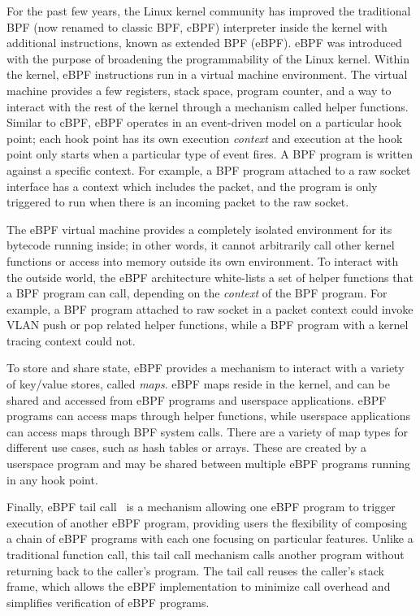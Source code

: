 \documentclass[10pt]{sigplanconf}
\begin{document}
For the past few years, the Linux kernel community has improved the traditional
BPF (now renamed to classic BPF, cBPF) interpreter inside the kernel with
additional instructions, known as extended BPF (eBPF). eBPF was introduced with
the purpose of broadening the programmability of the Linux kernel. Within the
kernel, eBPF instructions run in a virtual machine environment. The virtual
machine provides a few registers, stack space, program counter, and a way to
interact with the rest of the kernel through a mechanism called helper
functions.  Similar to cBPF, eBPF operates in an event-driven model on a
particular hook point; each hook point has its own execution {\em context} and
execution at the hook point only starts when a particular type of event fires.
A BPF program is written against a specific context. For example, a BPF program
attached to a raw socket interface has a context which includes the packet, and
the program is only triggered to run when there is an incoming packet to the
raw socket.

The eBPF virtual machine provides a completely isolated environment for its
bytecode running inside; in other words, it cannot arbitrarily call other
kernel functions or access into memory outside its own environment. To interact
with the outside world, the eBPF architecture white-lists a set of helper
functions that a BPF program can call, depending on the {\em context} of the
BPF program.  For example, a BPF program attached to raw socket in a packet
context could invoke VLAN push or pop related helper functions, while a BPF
program with a kernel tracing context could not. %

To store and share state, eBPF provides a mechanism to interact with a variety
of key/value stores, called \textit{maps}. eBPF maps reside in the kernel, and can be
shared and accessed from eBPF programs and userspace applications. eBPF
programs can access maps through helper functions, while userspace applications
can access maps through BPF system calls. There are a variety of map types for
different use cases, such as hash tables or arrays. These are created by a
userspace program and may be shared between multiple eBPF programs running in
any hook point.

Finally, eBPF tail call~\cite{tailcall} is a mechanism allowing one eBPF program to trigger execution of 
another eBPF program, providing users the flexibility of composing a chain of
eBPF programs with each one focusing on particular features.  Unlike a
traditional function call, this tail call mechanism calls another program
without returning back to the caller's program. The tail call reuses the
caller's stack frame, which allows the eBPF implementation to minimize call
overhead and simplifies verification of eBPF programs.
\end{document}

